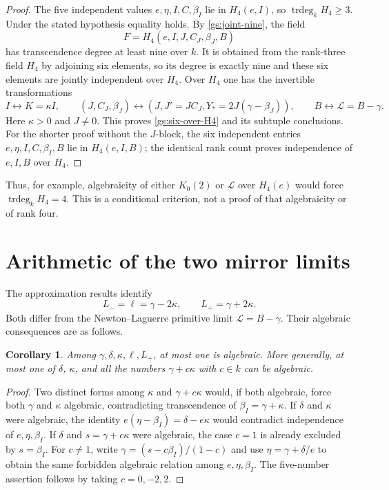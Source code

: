 \documentclass[11pt]{article}
\newtheorem{corollary}[theorem]{Corollary}
\theoremstyle{definition}
\theoremstyle{remark}
\begin{document}
\begin{proof}
The five independent values $e,\eta,I,C,\beta_I$ lie in
$H_4(e,I)$, so $\operatorname{trdeg}_kH_4\ge3$. Under the stated
hypothesis equality holds. By \eqref{gs:joint-nine}, the field
\[
 F=H_4(e,I,J,C_J,\beta_J,B)
\]
has transcendence degree at least nine over $k$. It is obtained from
the rank-three field $H_4$ by adjoining six elements, so its degree
is exactly nine and these six elements are jointly independent over
$H_4$. Over $H_4$ one has the invertible transformations
\[
 I\longleftrightarrow K=\kappa I,\qquad
 (J,C_J,\beta_J)\longleftrightarrow
 (J,J'=JC_J,Y_*=2J(\gamma-\beta_J)),\qquad
 B\longleftrightarrow\mathcal L=B-\gamma.
\]
Here $\kappa>0$ and $J\ne0$. This proves
\eqref{gs:six-over-H4} and its subtuple conclusions. For the shorter
proof without the $J$-block, the six independent entries
$e,\eta,I,C,\beta_I,B$ lie in $H_4(e,I,B)$; the identical rank count
proves independence of $e,I,B$ over $H_4$.
\end{proof}

Thus, for example, algebraicity of either $K_0(2)$ or
$\mathcal L$ over $H_4(e)$ would force
$\operatorname{trdeg}_kH_4=4$. This is a conditional criterion, not
a proof of that algebraicity or of rank four.



\section{Arithmetic of the two mirror limits}
The approximation results identify
\[
 L_-=\ell=\gamma-2\kappa,\qquad L_+=\gamma+2\kappa.
\]
Both differ from the Newton--Laguerre primitive limit
$\mathcal L=B-\gamma$. Their algebraic consequences are as follows.

\begin{corollary}\label{gs:mirror-algebraicity}
Among $\gamma,\delta,\kappa,\ell,L_+$, at most one is algebraic.
More generally, at most one of $\delta$, $\kappa$, and all the numbers
$\gamma+c\kappa$ with $c\in k$ can be algebraic.
\end{corollary}

\begin{proof}
Two distinct forms among $\kappa$ and $\gamma+c\kappa$ would,
if both algebraic, force both $\gamma$ and $\kappa$ algebraic,
contradicting transcendence of $\beta_I=\gamma+\kappa$.
If $\delta$ and $\kappa$ were algebraic, the identity
$e(\eta-\beta_I)=\delta-e\kappa$ would contradict independence of
$e,\eta,\beta_I$. If $\delta$ and
$s=\gamma+c\kappa$ were algebraic, the case $c=1$ is already
excluded by $s=\beta_I$. For $c\ne1$, write
$\gamma=(s-c\beta_I)/(1-c)$ and use
$\eta=\gamma+\delta/e$ to obtain the same forbidden algebraic
relation among $e,\eta,\beta_I$. The five-number assertion follows
by taking $c=0,-2,2$.
\end{proof}
\end{document}
